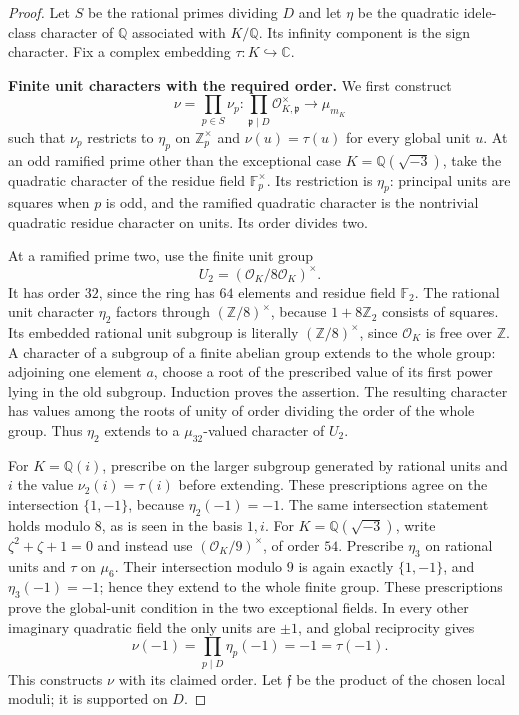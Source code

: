 \begin{proof}
Let $S$ be the rational primes dividing $D$ and let $\eta$ be the
quadratic idele-class character of $\mathbb Q$ associated with
$K/\mathbb Q$.  Its infinity component is the sign character.
Fix a complex embedding $\tau:K\hookrightarrow\mathbb C$.

\par\medskip\noindent\textbf{Finite unit characters with the required order.}
We first construct
\[
 \nu=\prod_{p\in S}\nu_p:
       \prod_{\mathfrak p\mid D}\mathcal O_{K,\mathfrak p}^{\times}
                    \longrightarrow\mu_{m_K}
\]
such that $\nu_p$ restricts to $\eta_p$ on $\mathbb Z_p^\times$
and $\nu(u)=\tau(u)$ for every global unit $u$.
At an odd ramified prime other than the exceptional case $K=\mathbb
Q(\sqrt{-3})$, take the quadratic character of the residue field
$\mathbb F_p^\times$.  Its restriction is $\eta_p$: principal
units are squares when $p$ is odd, and the ramified quadratic
character is the nontrivial quadratic residue character on units.
Its order divides two.

At a ramified prime two, use the finite unit group
\[
                    U_2=(\mathcal O_K/8\mathcal O_K)^\times.
\]
It has order $32$, since the ring has $64$ elements and residue
field $\mathbb F_2$.  The rational unit character $\eta_2$ factors
through $(\mathbb Z/8)^\times$, because $1+8\mathbb Z_2$ consists
of squares.  Its embedded rational unit subgroup is literally
$(\mathbb Z/8)^\times$, since $\mathcal O_K$ is free over
$\mathbb Z$.  A character of a subgroup of a finite abelian group
extends to the whole group: adjoining one element $a$, choose a
root of the prescribed value of its first power lying in the
old subgroup.  Induction proves the assertion.  The resulting
character has values among the roots of unity of order dividing
the order of the whole group.  Thus $\eta_2$ extends to a
$\mu_{32}$-valued character of $U_2$.

For $K=\mathbb Q(i)$, prescribe on the larger subgroup generated
by rational units and $i$ the value $\nu_2(i)=\tau(i)$ before
extending.  These prescriptions agree on the intersection
$\{1,-1\}$, because $\eta_2(-1)=-1$.  The same intersection
statement holds modulo $8$, as is seen in the basis $1,i$.
For $K=\mathbb Q(\sqrt{-3})$, write $\zeta^2+\zeta+1=0$ and
instead use $(\mathcal O_K/9)^\times$, of order $54$.
Prescribe $\eta_3$ on rational units and $\tau$ on $\mu_6$.
Their intersection modulo $9$ is again exactly $\{1,-1\}$,
and $\eta_3(-1)=-1$; hence they extend to the whole finite group.
These prescriptions prove the global-unit condition in the two
exceptional fields.  In every other imaginary quadratic field
the only units are $\pm1$, and global reciprocity gives
\[
       \nu(-1)=\prod_{p\mid D}\eta_p(-1)=-1=\tau(-1).
\]
This constructs $\nu$ with its claimed order.  Let $\mathfrak f$
be the product of the chosen local moduli; it is supported on $D$.


\end{proof}
